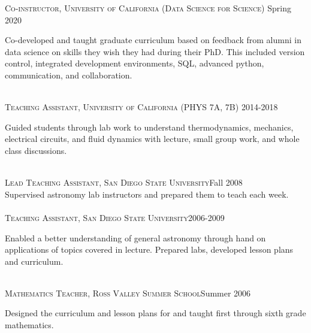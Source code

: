 \documentclass[10pt]{cv}
\begin{document}
\begin{llist}
\textsc{Co-instructor, University of California (Data Science for Science)} \hfill Spring 2020\\
\begin{minipage}[l]{0.7\textwidth}\vspace{0.15cm}
Co-developed and taught graduate curriculum based on feedback from alumni in data science on skills they wish they had during their PhD. This included version control, integrated development environments, SQL, advanced python, communication, and collaboration.\\
\end{minipage}\vspace{0.15cm}
\\
\textsc{Teaching Assistant, University of California} (PHYS 7A, 7B) \hfill 2014-2018\\
\begin{minipage}[l]{0.7\textwidth}\vspace{0.15cm}
Guided students through lab work to understand thermodynamics, mechanics, electrical circuits, and fluid dynamics with lecture, small group work, and whole class discussions.\\
\end{minipage}\vspace{0.15cm}
\\
\textsc{Lead Teaching Assistant, San Diego State University}\hfill Fall 2008\\
Supervised astronomy lab instructors and prepared them to teach each week. \\
\\
\textsc{Teaching Assistant, San Diego State University}\hfill 2006-2009\\
\begin{minipage}[l]{0.7\textwidth}\vspace{0.15cm}
Enabled a better understanding of general astronomy through hand on applications of topics covered in lecture. Prepared labs, developed lesson plans and curriculum.\\
\end{minipage}\vspace{0.15cm}
\\
\textsc{Mathematics Teacher, Ross Valley Summer School}\hfill Summer 2006\\
\begin{minipage}[l]{0.7\textwidth}\vspace{0.15cm}
Designed the curriculum and lesson plans for and taught first through sixth grade mathematics.\\

\end{minipage}
\end{llist}
\end{document}
